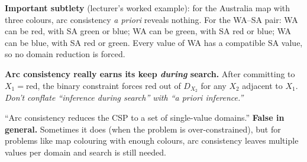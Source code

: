 \documentclass[11pt, a4paper]{article}
\begin{document}
\textbf{Important subtlety} (lecturer's worked example): for the Australia map with three colours, arc consistency \emph{a priori} reveals nothing. For the WA--SA pair: WA can be red, with SA green or blue; WA can be green, with SA red or blue; WA can be blue, with SA red or green. Every value of WA has a compatible SA value, so no domain reduction is forced.

\textbf{Arc consistency really earns its keep \emph{during} search.} After committing to $X_1 = \text{red}$, the binary constraint forces $\text{red}$ out of $D_{X_2}$ for any $X_2$ adjacent to $X_1$. \textit{Don't conflate ``inference during search'' with ``a priori inference.''}

\begin{trapbox}
``Arc consistency reduces the CSP to a set of single-value domains.'' \textbf{False in general.} Sometimes it does (when the problem is over-constrained), but for problems like map colouring with enough colours, arc consistency leaves multiple values per domain and search is still needed.
\end{trapbox}
\end{document}
